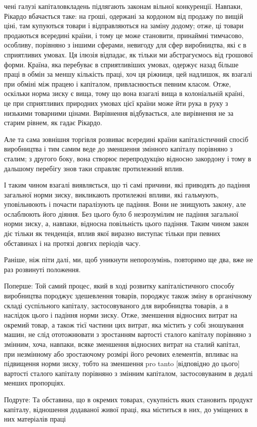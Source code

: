 чені галузі капіталовкладень підлягають законам вільної конкуренції. Навпаки, Рікардо вбачається
таке: на гроші, одержані за кордоном від продажу по вищій ціні, там купуються товари і
відправляються на заміну додому; отже, ці товари продаються
всередині країни, і тому це може становити, принаймні тимчасово, особливу, порівняно з іншими
сферами, невигоду для сфер виробництва, які є в сприятливих умовах. Ця ілюзія відпадає, як тільки ми
абстрагуємось від грошової форми. Країна,
яка перебуває в сприятливіших умовах, одержує назад більше праці в обмін за меншу кількість праці,
хоч ця ріжниця, цей надлишок, як взагалі при обміні між працею і капіталом, привласнюється певним
класом. Отже, оскільки норма зиску є вища, тому
що вона взагалі вища в колоніальній країні, це при сприятливих природних умовах цієї країни може йти
рука в руку з низькими товарними цінами. Вирівнення відбувається, але вирівнення не за старим
рівнем, як гадає Рікардо.

Але та сама зовнішня торгівля розвиває всередині країни капіталістичний спосіб виробництва і тим
самим веде до зменшення змінного капіталу порівняно з сталим; з другого боку, вона створює
перепродукцію відносно закордону і тому в дальшому перебігу знов таки справляє протилежний вплив.

І    таким чином взагалі виявляється, що ті самі причини, які приводять до падіння загальної норми
зиску, викликають протилежні впливи, які гальмують, уповільнюють і почасти паралізують це падіння.
Вони не знищують закону, але ослаблюють його діяння. Без цього було б незрозумілим не падіння
загальної норми зиску, а, навпаки, відносна повільність цього падіння. Таким чином закон діє тільки
як тенденція, вплив якої виразно виступає тільки при певних обставинах і на протязі довгих періодів
часу.

Раніше, ніж піти далі, ми, щоб уникнути непорозумінь, повторимо ще два, вже не раз розвинуті
положення.

Поперше: Той самий процес, який в ході розвитку капіталістичного способу виробництва породжує
здешевлення товарів, породжує також зміну в органічному складі суспільного капіталу, застосовуваного
для виробництва товарів, а в наслідок цього і падіння норми зиску. Отже, зменшення відносних витрат
на окремий товар, а також тієї частини цих витрат, яка містить у собі зношування машин, не слід
ототожнювати з зростанням вартості сталого капіталу порівняно з змінним, хоча, навпаки, всяке
зменшення відносних витрат на сталий капітал, при незмінному або зростаючому розмірі його речових
елементів, впливає на підвищення норми зиску, тобто на зменшення pro tanto [відповідно до цього]
вартості сталого капіталу порівняно з змінним капіталом, застосовуваним в дедалі менших пропорціях.

Подруге: Та обставина, що в окремих товарах, сукупність яких становить продукт капіталу, відношення
додаваної живої праці, яка міститься в них, до уміщених в них матеріалів праці
